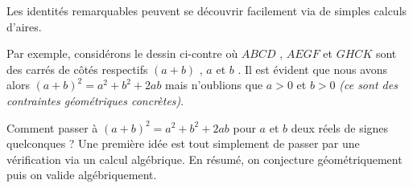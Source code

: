 \begin{figure} 
	\vspace{-.5em}
	\begin{center}
	\end{center}
	\vspace{-2.25em}
\end{figure} 

Les identités remarquables peuvent se découvrir facilement via de simples calculs d'aires.


\medskip

Par exemple, considérons le dessin ci-contre où $ABCD$ , $AEGF$ et $GHCK$ sont des carrés de côtés respectifs $(a + b)$ , $a$ et $b$ .
Il est évident que nous avons alors $(a + b)^2 = a^2 + b^2 + 2 ab$ mais n'oublions que $a > 0$ et $b > 0$ \emph{(ce sont des contraintes géométriques concrètes)}.


\medskip

Comment passer à $(a + b)^2 = a^2 + b^2 + 2 ab$ pour $a$ et $b$ deux réels de signes quelconques ?
Une première idée est tout simplement de passer par une vérification via un calcul algébrique. En résumé, on conjecture géométriquement puis on valide algébriquement.


\medskip

\begin{figure} 
	\vspace{-.5em}
	\begin{center}
	\end{center}
	\vspace{-1.25em}
\end{figure} 

